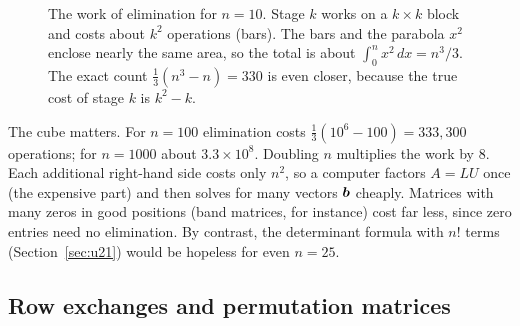 \begin{figure}[ht]
\centering
{}
\caption{The work of elimination for $n=10$. Stage $k$ works on a $k\times k$ block and costs
about $k^2$ operations (bars). The bars and the parabola $x^2$ enclose nearly the same area,
so the total is about $\int_0^n x^2\,dx=n^3/3$. The exact count $\frac13(n^3-n)=330$ is even
closer, because the true cost of stage $k$ is $k^2-k$.}\label{fig:u05-cost}
\end{figure}

The cube matters. For $n=100$ elimination costs $\tfrac13(10^6-100)=333{,}300$ operations;
for $n=1000$ about $3.3\times10^8$. Doubling $n$ multiplies the work by $8$. Each additional
right-hand side costs only $n^2$, so a computer factors $A=LU$ once (the expensive part) and
then solves for many vectors $\boldsymbol{b}$ cheaply. Matrices with many zeros in good positions
(band matrices, for instance) cost far less, since zero entries need no elimination. By
contrast, the determinant formula with $n!$ terms (Section~\ref{sec:u21}) would be hopeless
for even $n=25$.

\subsection{Row exchanges and permutation matrices}

